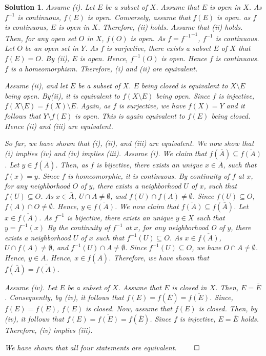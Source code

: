 \documentclass{article} %
\theoremstyle{quest}
\newtheorem*{solution}{Solution}
\begin{document}
\begin{solution}
Assume (i). Let $E$ be a subset of $X$. 
Assume that $E$ is open in $X$. As $f^{-1}$ is continuous, $f(E)$
is open. Conversely, assume that $f(E)$ is open. as $f$ is continuous,
$E$ is open in $X$. Therefore, (ii) holds.
Assume that (ii) holds. Then, for
any open set $O$ in $X$, $f(O)$ is open. As $f = {f^{-1}}^{-1}$,
$f^{-1}$ is continuous. 
Let $O$ be an open set in $Y$. As $f$ is surjective, there exists 
a subset $E$ of $X$ that $f(E) = O$. By (ii), $E$ is open. Hence,
$f^{-1}(O)$ is open. Hence $f$ is continuous. $f$ is a homeomorphism. 
Therefore, (i) and (ii) are equivalent.  

\bigskip

Assume (ii), and let $E$ be a subset of $X$. $E$ being closed is 
equivalent to $X \setminus E$ being open. By(ii), it is
equivalent to  $f(X\setminus E)$ being open. Since $f$ is injective, 
$f(X\setminus E) = f(X) \setminus E$. Again, as $f$ is surjective,
we have $f(X) =Y$ and it follows that $Y \setminus f(E)$ is open.
This is again equivalent to $f(E)$ being closed. Hence (ii) and (iii)
are equivalent. 
 
\bigskip

So far, we have shown that (i), (ii), and (iii) are equivalent. We now 
show that (i) implies (iv) and (iv) implies (iii). 
Assume (i). We claim that $f(\bar{A}) \subseteq \overline{f(A)}$. Let
$y \in f(\bar{A})$. Then, as $f$ is bijective, there exists 
an unique $x \in \bar{A}$, such that
$f(x) = y$. Since $f$ is homeomorphic, it is continuous. 
By continuity of $f$ at $x$, for any neighborhood $O$
of $y$, there exists a neighborhood $U$ of $x$, such that $f(U) \subseteq 
O$. As $x \in \bar{A}$, $U \cap A \neq \emptyset$, and $f(U) \cap f(A) 
\neq \emptyset$. Since $f(U) \subseteq O$, $f(A) \cap O \neq \emptyset$. 
Hence, $y \in \overline{f(A)}$. We now claim that
$\overline{f(A)} \subseteq f(\bar{A})$. Let $x \in \overline{f(A)}$.
As $f^{-1}$ is bijective, there exists an unique $y \in X$ such that
$y = f^{-1}(x)$ By the continuity of $f^{-1}$ at $x$, for any neighborhood 
O of $y$, there exists a neighborhood $U$ of $x$ such that $f^{-1}(U)
\subseteq O$. As $x \in \overline{f(A)}$, $U \cap f(A) \neq \emptyset$,
and $f^{-1}(U) \cap A \neq \emptyset$. Since $f^{-1}(U) \subseteq
O$, we have $O \cap A \neq \emptyset$. Hence, $y \in \overline{A}$. 
Hence, $x \in f(\overline{A})$. Therefore, we have shown that
$f(\bar{A}) = \overline{f(A)}$. 

\smallskip

Assume (iv). Let $E$ be a subset of $X$. Assume that $E$ is closed in $X$.
Then, $E = \overline{E}$. Consequently, by (iv), it follows that $f(E) = f(
\overline{E}) = \overline{f(E)}$. Since, $f(E) = \overline{f(E)}$, 
$f(E)$ is closed.  Now, assume that $f(E)$ is closed. Then, by (iv), 
it follows that $f(E) = \overline{f(E)} = f(\overline{E})$. Since $f$
is injective, $E = \overline{E}$ holds. Therefore, (iv) implies (iii). 

\bigskip

We have shown that all four statements are equivalent. \hfill $\qed$
\end{solution}
\end{document}
